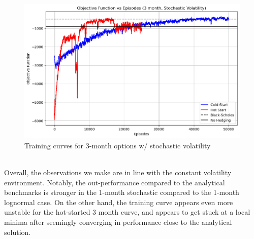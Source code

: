 \documentclass{article}
\begin{document}
\begin{figure}[h!]
    \centering
    \includegraphics[width=.9\linewidth]{figures/3m_stoch.png}
    \caption{Training curves for 3-month options w/ stochastic volatility}
    \label{fig:3m_stoch}
\end{figure}\\
Overall, the observations we make are in line with the constant volatility environment. Notably, the out-performance compared to the analytical benchmarks is stronger in the 1-month stochastic compared to the 1-month lognormal case. On the other hand, the training curve appears even more unstable for the hot-started 3 month curve, and appears to get stuck at a local minima after seemingly converging in performance close to the analytical solution.
\end{document}
